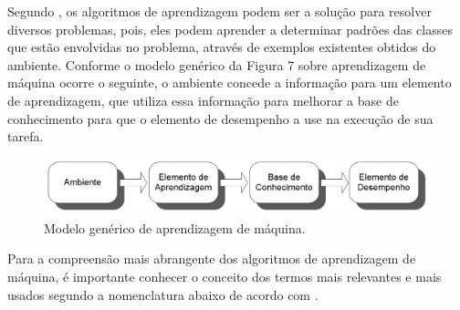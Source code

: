 \par
Segundo , os algoritmos de aprendizagem podem ser a solução para resolver diversos problemas, pois, eles podem aprender a determinar padrões das classes que estão envolvidas no problema, através de exemplos existentes obtidos do ambiente. Conforme o modelo genérico da Figura 7 sobre aprendizagem de máquina ocorre o seguinte, o ambiente concede a informação para um elemento de aprendizagem, que utiliza essa informação para melhorar a base de conhecimento para que o elemento de desempenho a use na execução de sua tarefa. 

\begin{figure}[!htp]
	\begin{center}
    \caption{\label{fig:waveform_fig} Modelo genérico de aprendizagem de máquina.}
	\includegraphics[scale=0.45]{Figuras/Modelo_Machine_Learning.png}
	\end{center}
\end{figure}

\par
Para a compreensão mais abrangente dos algoritmos de aprendizagem de máquina, é importante conhecer o conceito dos termos mais relevantes e mais usados segundo a nomenclatura abaixo de acordo com \cite{Monard2003, Souto2003, Henke2011}.

